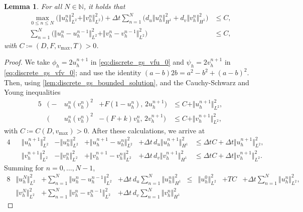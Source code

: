 \documentclass[11pt, a4paper]{amsart}
\newcommand{\NN}{\mathbb{N}}
\newtheorem{lemma}[theorem]{Lemma}%
\numberwithin{equation}{section}
\begin{document}
	
	\begin{lemma}\label{lem:discrete_gs_apriori}
		For all $N\in\NN$, it holds that
		\begin{align*}
			\max_{0\leq n\leq N}\Big(\Vert u_h^n\Vert_{L^2}^2 + \Vert v_h^n\Vert_{L^2}^2 \Big)+ \Delta t \sum_{n = 1}^{N}\Big(d_u\Vert u_h^n\Vert_{H^1}^2 + d_v\Vert v_h^n\Vert_{H^1}^2\Big)&\leq C,
			\\
			\sum_{n = 1}^{N}\Big(\Vert u_h^{n} - u_h^{n-1}\Vert_{L^2}^2+\Vert v_h^{n} - v_h^{n-1}\Vert_{L^2}^2\Big)&\leq C,
		\end{align*}
		with $C\coloneqq (D, F, v_{\mathrm{max}}, T)>0$.
	\end{lemma}
	\begin{proof}
		We take $\phi_h = 2u_h^{n+1}$ in \eqref{eq:discrete_gs_vfu_0} and $\psi_h = 2v_h^{n+1}$ in \eqref{eq:discrete_gs_vfv_0}; and use the identity
		$
		(a - b) 2b = a^2 - b^2 + (a-b)^2
		$. Then, using \cref{lem:discrete_gs_bounded_solution}, and the Cauchy-Schwarz and Young inequalities
		\begin{alignat*}{5}
			&\big(-&u_h^n (v_h^n)^2& + F(1 - u_h^n),\, 2u_h^{n+1} \big)&{}\leq{} C + \Vert u_h^{n+1}\Vert_{L^2}^2,
			\\
			&\big(&u_h^n (v_h^n)^2 & - (F + k)v_h^n,\, 2v_h^{n+1} \big)&{}\leq{} C + \Vert v_h^{n+1}\Vert_{L^2}^2,
		\end{alignat*}
		with $C\coloneqq C(D,v_{\mathrm{max}})>0$. After these calculations, we arrive at
		\begin{alignat*}{4}
			&&\Vert u_h^{n+1}\Vert_{L^2}^2 &- \Vert u_h^{n}\Vert_{L^2}^2& + \Vert u_h^{n+1} - u_h^{n}\Vert_{L^2}^2& + \Delta t \,d_u\Vert u_h^{n+1}\Vert_{H^1}^2 
			&{}\leq  \Delta t C+ \Delta t\Vert u_h^{n+1}\Vert_{L^2}^2,
			\\[5pt]
			&&\Vert v_h^{n+1}\Vert_{L^2}^2 &- \Vert v_h^{n}\Vert_{L^2}^2& + \Vert v_h^{n+1} - v_h^{n}\Vert_{L^2}^2& + \Delta t \, d_v\Vert v_h^{n+1}\Vert_{H^1}^2 
			&{}\leq  \Delta t C + \Delta t\Vert v_h^{n+1}\Vert_{L^2}^2.
		\end{alignat*}
		Summing for $n = 0,\ldots,N-1$,
		\begin{alignat*}{8}
			&\Vert u_h^{N}\Vert_{L^2}^2 &+ \sum_{n = 1}^{N}\Vert u_h^{n} - u_h^{n-1}\Vert_{L^2}^2 &+ \Delta t \,d_u\sum_{n = 1}^{N}\Vert u_h^{n}\Vert_{H^1}^2& {}\leq{} &  \Vert u_h^{0}\Vert_{L^2}^2 &+ TC &+ \Delta t\sum_{n = 1}^{N}\Vert u_h^{n}\Vert_{L^2}^2,
			\\
			&\Vert v_h^{N}\Vert_{L^2}^2 &+ \sum_{n = 1}^{N}\Vert v_h^{n} - v_h^{n-1}\Vert_{L^2}^2 & + \Delta t \,d_v\sum_{n = 1}^{N}\Vert v_h^{n}\Vert_{H^1}^2 

\end{alignat*}
\end{proof}
\end{document}
